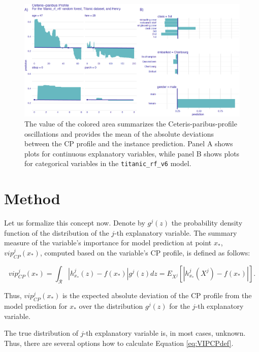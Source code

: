 \documentclass[]{krantz}
\begin{document}
\begin{figure}

{\centering \includegraphics[width=0.99\linewidth]{figure/profile_v4_rf2} 

}

\caption{The value of the colored area summarizes the Ceteris-paribus-profile oscillations and provides the mean of the absolute deviations between the CP profile and the instance prediction. Panel A shows plots for continuous explanatory variables, while panel B shows plots for categorical variables in the \texttt{titanic\_rf\_v6} model.}\label{fig:CPVIPprofiles}
\end{figure}

\hypertarget{CPOscMethod}{%
\section{Method}\label{CPOscMethod}}

Let us formalize this concept now. Denote by \(g^j(z)\) the probability density function of the distribution of the \(j\)-th explanatory variable. The summary measure of the variable's importance for model prediction at point \(x_*\), \(vip_{CP}^{j}(x_*)\), computed based on the variable's CP profile, is defined as follows:

\begin{equation}
vip_{CP}^j(x_*) = \int_{\mathcal R} |h^{j}_{x_*}(z) - f(x_*)| g^j(z)dz=E_{X^j}\left[|h^{j}_{x_*}(X^j) - f(x_*)|\right].
\label{eq:VIPCPdef}
\end{equation}

Thus, \(vip_{CP}^j(x_*)\) is the expected absolute deviation of the CP profile from the model prediction for \(x_*\) over the distribution \(g^j(z)\) for the \(j\)-th explanatory variable.

The true distribution of \(j\)-th explanatory variable is, in most cases, unknown. Thus, there are several options how to calculate Equation \eqref{eq:VIPCPdef}.
\end{document}
